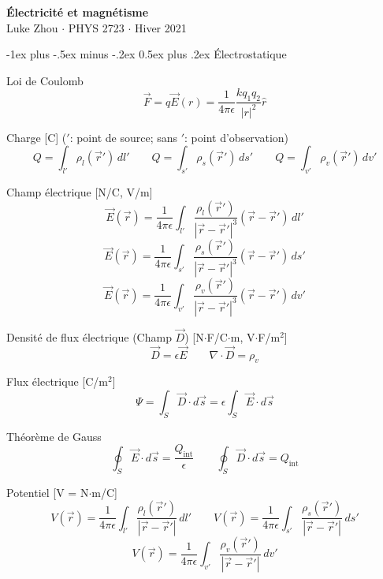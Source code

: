 \documentclass[10pt,landscape]{article}
\makeatletter
\renewcommand{\section}{\@startsection{section}{1}{0mm}%
                                {-1ex plus -.5ex minus -.2ex}%
                                {0.5ex plus .2ex}%
                                {\normalfont\large\bfseries}}
\makeatother
\begin{document}
\raggedright
\footnotesize
\begin{multicols}{3}


\setlength{\premulticols}{1pt}
\setlength{\postmulticols}{1pt}
\setlength{\multicolsep}{1pt}
\setlength{\columnsep}{2pt}

\begin{center}
     \Large{\textbf{Électricité et magnétisme}} \\
     \small{Luke Zhou $\cdot$ PHYS 2723 $\cdot$ Hiver 2021}
\end{center}

\section{Électrostatique}

Loi de Coulomb  
 \[ \vec{F} = q\vec{E}(r) = \frac{1}{4\pi\epsilon} \frac{kq_1q_2}{|r|^2} \hat{r}  \]

Charge  [C] ($'$: point de source; sans $'$: point d'observation)
\[  Q = \int_{l'} \rho_l(\vec{r}') \,dl'  \qquad  Q = \int_{s'} \rho_s(\vec{r}') \,ds'  \qquad Q = \int_{v'} \rho_v(\vec{r}') \,dv'  \]

Champ électrique [N/C, V/m]
\[ \vec{E}(\vec{r}) = \frac{1}{4\pi\epsilon} \int_{l'} \frac{\rho_l(\vec{r}')}{| \vec{r} - \vec{r}' |^3 } (\vec{r} - \vec{r}' )\,dl'  \]
%
\[\vec{E}(\vec{r}) = \frac{1}{4\pi\epsilon} \int_{s'} \frac{\rho_s(\vec{r}')}{| \vec{r} - \vec{r}'|^3 } (\vec{r} - \vec{r}' )\,ds' \]
%
\[\vec{E}(\vec{r}) = \frac{1}{4\pi\epsilon} \int_{v'} \frac{\rho_v(\vec{r}')}{| \vec{r} - \vec{r}' |^3 } (\vec{r} - \vec{r}' )\,dv'  \]

Densité de flux électrique (Champ $\vec{D}$)  [N$\cdot$F/C$\cdot$m, V$\cdot$F/m${}^2$]
\[ \vec{D} = \epsilon\vec{E}
\qquad \nabla \cdot \vec{D} = \rho_v \]

Flux électrique [C/m${}^2$]
\[ \Psi = \int_{S} \vec{D} \cdot d\vec{s} = \epsilon \int_{S} \vec{E} \cdot d\vec{s} \]

Théorème de Gauss
\[ \oint_S \vec{E}\cdot d\vec{s} = \frac{Q_\text{int}}{\epsilon}
\qquad  \oint_S \vec{D}\cdot d\vec{s} = Q_\text{int} \]

Potentiel [V = N$\cdot$m/C]
\[ {V}(\vec{r}) = \frac{1}{4\pi\epsilon} \int_{l'} \frac{\rho_l(\vec{r}')}{| \vec{r} - \vec{r}' | } \,dl'
\qquad  {V}(\vec{r}) = \frac{1}{4\pi\epsilon} \int_{s'} \frac{\rho_s(\vec{r}')}{| \vec{r} - \vec{r}'| } \,ds'  \]
%
\[ {V}(\vec{r}) = \frac{1}{4\pi\epsilon} \int_{v'} \frac{\rho_v(\vec{r}')}{| \vec{r} - \vec{r}' | } \,dv'  \]


\end{multicols}
\end{document}
